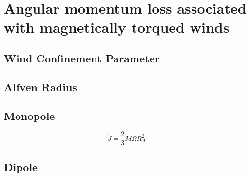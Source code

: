 \section{Angular momentum loss associated with magnetically torqued winds}
\subsection{Wind Confinement Parameter}

\subsection{Alfven Radius}

\subsection{Monopole}
\begin{equation}
\dot{J}=\frac{2}{3}\dot{M}\Omega R_A^2
\end{equation}
\subsection{Dipole}